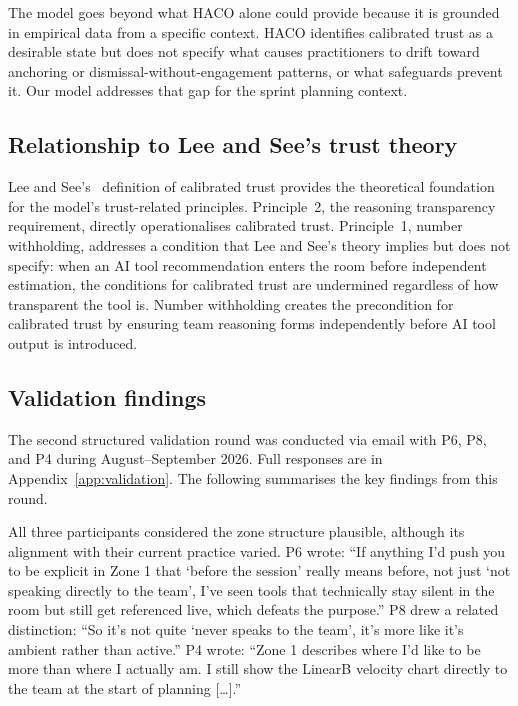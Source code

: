 \documentclass[a4paper,twoside]{bth}
\begin{document}
The model goes beyond what HACO alone could provide because it is grounded in empirical data from a specific context. HACO identifies calibrated trust as a desirable state but does not specify what causes practitioners to drift toward anchoring or dismissal-without-engagement patterns, or what safeguards prevent it. Our model addresses that gap for the sprint planning context.

\subsection{Relationship to Lee and See's trust theory}

Lee and See's~\cite{lee2004trust} definition of calibrated trust provides the theoretical foundation for the model's trust-related principles. Principle~2, the reasoning transparency requirement, directly operationalises calibrated trust. Principle~1, number withholding, addresses a condition that Lee and See's theory implies but does not specify: when an AI tool recommendation enters the room before independent estimation, the conditions for calibrated trust are undermined regardless of how transparent the tool is. Number withholding creates the precondition for calibrated trust by ensuring team reasoning forms independently before AI tool output is introduced.

\subsection{Validation findings}

The second structured validation round was conducted via email with P6, P8, and P4 during August--September 2026. Full responses are in Appendix~\ref{app:validation}. The following summarises the key findings from this round.

All three participants considered the zone structure plausible, although its alignment with their current practice varied. P6 wrote: ``If anything I'd push you to be explicit in Zone 1 that `before the session' really means before, not just `not speaking directly to the team', I've seen tools that technically stay silent in the room but still get referenced live, which defeats the purpose.'' P8 drew a related distinction: ``So it's not quite `never speaks to the team', it's more like it's ambient rather than active.'' P4 wrote: ``Zone 1 describes where I'd like to be more than where I actually am. I still show the LinearB velocity chart directly to the team at the start of planning {[}\ldots{]}.''
\end{document}
